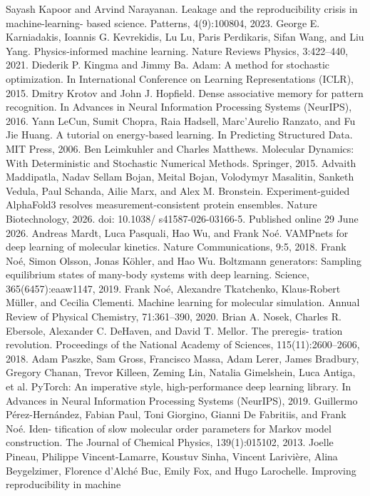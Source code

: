 \documentclass{article}
\begin{document}
Sayash Kapoor and Arvind Narayanan. Leakage and the reproducibility crisis in machine-learning-
based science. Patterns, 4(9):100804, 2023.
George E. Karniadakis, Ioannis G. Kevrekidis, Lu Lu, Paris Perdikaris, Sifan Wang, and Liu Yang.
Physics-informed machine learning. Nature Reviews Physics, 3:422--440, 2021.
Diederik P. Kingma and Jimmy Ba. Adam: A method for stochastic optimization. In International
Conference on Learning Representations (ICLR), 2015.
Dmitry Krotov and John J. Hopfield. Dense associative memory for pattern recognition. In Advances
in Neural Information Processing Systems (NeurIPS), 2016.
Yann LeCun, Sumit Chopra, Raia Hadsell, Marc'Aurelio Ranzato, and Fu Jie Huang. A tutorial on
energy-based learning. In Predicting Structured Data. MIT Press, 2006.
Ben Leimkuhler and Charles Matthews. Molecular Dynamics: With Deterministic and Stochastic
Numerical Methods. Springer, 2015.
Advaith Maddipatla, Nadav Sellam Bojan, Meital Bojan, Volodymyr Masalitin, Sanketh Vedula,
Paul Schanda, Ailie Marx, and Alex M. Bronstein.
Experiment-guided AlphaFold3 resolves
measurement-consistent protein ensembles.
Nature Biotechnology, 2026.
doi:
10.1038/
s41587-026-03166-5. Published online 29 June 2026.
Andreas Mardt, Luca Pasquali, Hao Wu, and Frank No\'e. VAMPnets for deep learning of molecular
kinetics. Nature Communications, 9:5, 2018.
Frank No\'e, Simon Olsson, Jonas K\"ohler, and Hao Wu. Boltzmann generators: Sampling equilibrium
states of many-body systems with deep learning. Science, 365(6457):eaaw1147, 2019.
Frank No\'e, Alexandre Tkatchenko, Klaus-Robert M\"uller, and Cecilia Clementi. Machine learning
for molecular simulation. Annual Review of Physical Chemistry, 71:361--390, 2020.
Brian A. Nosek, Charles R. Ebersole, Alexander C. DeHaven, and David T. Mellor. The preregis-
tration revolution. Proceedings of the National Academy of Sciences, 115(11):2600--2606, 2018.
Adam Paszke, Sam Gross, Francisco Massa, Adam Lerer, James Bradbury, Gregory Chanan, Trevor
Killeen, Zeming Lin, Natalia Gimelshein, Luca Antiga, et al. PyTorch: An imperative style,
high-performance deep learning library. In Advances in Neural Information Processing Systems
(NeurIPS), 2019.
Guillermo P\'erez-Hern\'andez, Fabian Paul, Toni Giorgino, Gianni De Fabritiis, and Frank No\'e. Iden-
tification of slow molecular order parameters for Markov model construction. The Journal of
Chemical Physics, 139(1):015102, 2013.
Joelle Pineau, Philippe Vincent-Lamarre, Koustuv Sinha, Vincent Larivi\`ere, Alina Beygelzimer,
Florence d'Alch\'e Buc, Emily Fox, and Hugo Larochelle. Improving reproducibility in machine
\end{document}
